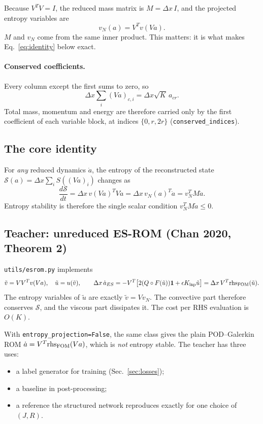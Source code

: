 \documentclass[11pt,a4paper]{article}
\newcommand{\code}[1]{\texttt{\small #1}}
\newcommand{\Sc}{\mathcal S}
\begin{document}
Because $V^TV=I$, the reduced mass matrix is $M=\Delta x\,I$, and the projected entropy variables are
\begin{equation}\label{eq:vN}
v_N(a)=V^Tv(Va).
\end{equation}
$M$ and $v_N$ come from the same inner product. This matters: it is what makes Eq.~\eqref{eq:identity} below exact.

\paragraph{Conserved coefficients.} Every column except the first sums to zero, so
\[ \Delta x\textstyle\sum_i(Va)_{c,i} = \Delta x\sqrt K\,a_{cr}. \]
Total mass, momentum and energy are therefore carried only by the first coefficient of each variable block, at indices $\{0,r,2r\}$ (\code{conserved\_indices}).

\subsection{The core identity}
For \emph{any} reduced dynamics $\dot a$, the entropy of the reconstructed state $\Sc(a)=\Delta x\sum_iS((Va)_i)$ changes as
\begin{equation}\label{eq:identity}
\frac{d\Sc}{dt}=\Delta x\,v(Va)^TV\dot a=\Delta x\,v_N(a)^T\dot a = v_N^TM\dot a .
\end{equation}
Entropy stability is therefore the single scalar condition $v_N^TM\dot a\le0$.

\subsection{Teacher: unreduced ES-ROM (Chan 2020, Theorem 2)}
\code{utils/esrom.py} implements
\[
\tilde v = VV^Tv(Va),\quad \tilde u=u(\tilde v),\qquad
\Delta x\,\dot a_{ES}=-V^T\big[2(Q\circ F(\tilde u))\mathbf 1+\epsilon K_{\rm lap}\tilde u\big]
= \Delta x\,V^T\mathrm{rhs}_{\rm FOM}(\tilde u).
\]
The entropy variables of $\tilde u$ are exactly $\tilde v=Vv_N$. The convective part therefore conserves $\Sc$, and the viscous part dissipates it. The cost per RHS evaluation is $O(K)$.

With \code{entropy\_projection=False}, the same class gives the plain POD--Galerkin ROM $\dot a=V^T\mathrm{rhs}_{\rm FOM}(Va)$, which is \emph{not} entropy stable. The teacher has three uses:
\begin{itemize}
\item a label generator for training (Sec.~\ref{sec:losses});
\item a baseline in post-processing;
\item a reference the structured network reproduces exactly for one choice of $(J,R)$.
\end{itemize}
\end{document}
